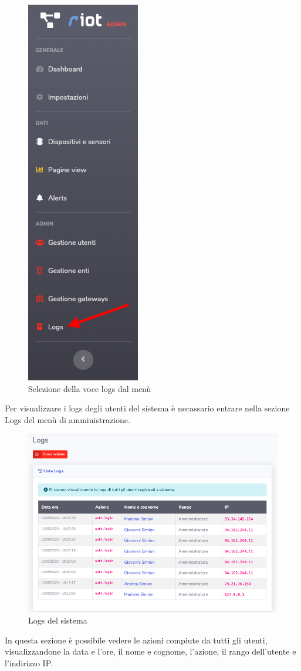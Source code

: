 		\begin{figure}[H]
		\centering
		\includegraphics[scale=0.600]{res/images/admin/menuLogs.png}
		\caption{Selezione della voce logs dal menù}
	\end{figure}

		Per visualizzare i logs degli utenti del sistema è necassario entrare nella sezione Logs del menù di amministrazione.

		\begin{figure}[H]
		\centering
		\includegraphics[scale=0.600]{res/images/admin/logs.png}
		\caption{Logs del sistema}
	\end{figure}

		In questa sezione è possibile vedere le azioni compiute da tutti gli utenti, visualizzandone la data e l'ore, il nome e cognome, l'azione, il rango dell'utente e l'indirizzo IP.